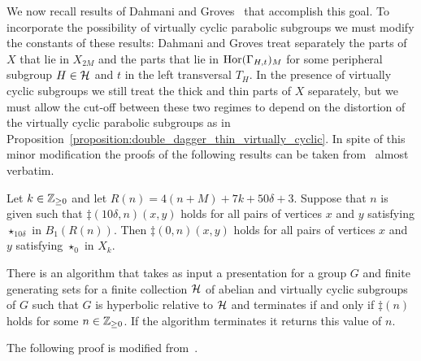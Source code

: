We now recall results of Dahmani and Groves~\cite{dahmanigroves08a} that accomplish this goal.
To incorporate the possibility of virtually cyclic parabolic subgroups we must modify the constants of these results: Dahmani and Groves treat separately the parts of $X$ that lie in $X_{2M}$ and the parts that lie in $\operatorname{Hor}(\Gamma_{H,t})_{M}$ for some peripheral subgroup $H \in \mathcal{H}$ and $t$ in the left transversal $T_H$.
In the presence of virtually cyclic subgroups we still treat the thick and thin parts of $X$ separately, but we must allow the cut-off between these two regimes to depend on the distortion of the virtually cyclic parabolic subgroups as in Proposition~\ref{proposition:double_dagger_thin_virtually_cyclic}.
In spite of this minor modification the proofs of the following results can be taken from~\cite{dahmanigroves08a} almost verbatim.

\begin{proposition}\cite[Lemma 4.4]{dahmanigroves08a} \label{proposition:check_finite_ball}
  Let $k \in \mathbb{Z}_{\geq 0}$ and let $R(n) = 4(n+M) + 7k + 50\delta + 3$. 
  Suppose that $n$ is given such that $\ddag(10\delta,n)(x,y)$ holds for all pairs of vertices $x$ and $y$ satisfying $\star_{10\delta}$ in $B_1(R(n))$.
  Then $\ddag(0,n)(x,y)$ holds for all pairs of vertices $x$ and $y$ satisfying $\star_0$ in $X_k$.
\end{proposition}

\begin{theorem}\cite[Proposition 5.1]{dahmanigroves08a}
  \label{theorem:double_dagger_computable}
  There is an algorithm that takes as input a presentation for a group $G$ and finite generating sets for a finite collection $\mathcal{H}$ of abelian and virtually cyclic subgroups of $G$ such that $G$ is hyperbolic relative to $\mathcal{H}$ and terminates if and only if $\ddag(n)$ holds for some $n \in \mathbb{Z}_{\geq 0}$. 
  If the algorithm terminates it returns this value of $n$.
\end{theorem}

The following proof is modified from~\cite{dahmanigroves08a}.

